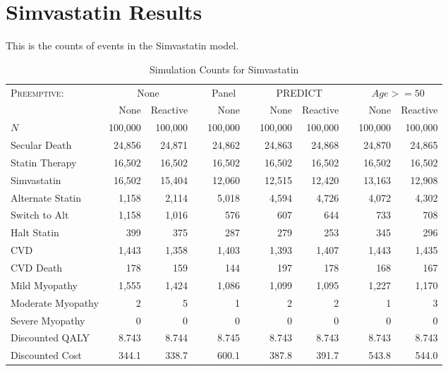 \documentclass{article}
\begin{document}
\newcommand{\ra}[1]{\renewcommand{\arraystretch}{#1}}

\section{Simvastatin Results}

This is the counts of events in the Simvastatin model.

\begin{table*}\centering
\ra{1.1}
\begin{tabular}{@{}lrrrrrrrrrr@{}}\toprule
  \textsc{Preemptive:} &
  \multicolumn{2}{c}{None }      & \phantom{a} &
  \multicolumn{1}{c}{Panel}      & \phantom{a} &
  \multicolumn{2}{c}{PREDICT}    & \phantom{a} &
  \multicolumn{2}{c}{$Age >= 50$} \\

\cmidrule{2-3} \cmidrule{5-5} \cmidrule{7-8} \cmidrule{10-11}
                  & None    & Reactive && None    && None    & Reactive && None    & Reactive \\
\midrule
$N$               & 100,000 & 100,000  && 100,000 && 100,000 & 100,000  && 100,000 & 100,000 \\
Secular Death     &  24,856 &  24,871  &&  24,862 &&  24,863 &  24,868  &&  24,870 &  24,865 \\
Statin Therapy    &  16,502 &  16,502  &&  16,502 &&  16,502 &  16,502  &&  16,502 &  16,502 \\
Simvastatin       &  16,502 &  15,404  &&  12,060 &&  12,515 &  12,420  &&  13,163 &  12,908 \\
Alternate Statin  &   1,158 &   2,114  &&   5,018 &&   4,594 &   4,726  &&   4,072 &   4,302 \\
Switch to Alt     &   1,158 &   1,016  &&     576 &&     607 &     644  &&     733 &     708 \\
Halt Statin       &     399 &     375  &&     287 &&     279 &     253  &&     345 &     296 \\
CVD               &   1,443 &   1,358  &&   1,403 &&   1,393 &   1,407  &&   1,443 &   1,435 \\
CVD Death         &     178 &     159  &&     144 &&     197 &     178  &&     168 &     167 \\
Mild Myopathy     &   1,555 &   1,424  &&   1,086 &&   1,099 &   1,095  &&   1,227 &   1,170 \\
Moderate Myopathy &       2 &       5  &&       1 &&       2 &       2  &&       1 &       3 \\
Severe Myopathy   &       0 &       0  &&       0 &&       0 &       0  &&       0 &       0 \\
\cmidrule{1-11}
Discounted QALY   &   8.743 &   8.744  &&   8.745 &&   8.743 &   8.743  &&   8.743 &   8.743 \\
Discounted Cost   & 344.1   & 338.7    && 600.1   && 387.8   & 391.7    && 543.8   & 544.0   \\
\bottomrule
\end{tabular}
\caption{Simulation Counts for Simvastatin}
\end{table*}
\end{document}
